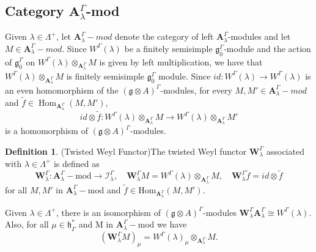 \documentclass[11pt]{amsart}
\theoremstyle{plain}
\theoremstyle{definition}
\newtheorem{defn}[thm]{Definition}
\newcommand{\g}{\mathfrak{g}}
\newcommand{\h}{\mathfrak{h}}
\newcommand{\A}{\mathbf{A}_{\lambda}^{\Gamma}}
\DeclareMathOperator{\Hom}{Hom}
\begin{document}
\subsection{Category $\A$-mod}\label{sub:2}
Given $\lambda\in \Lambda^+$, let $\mathbf{A}_{\lambda}^{\Gamma}-mod$ denote the category of left $\mathbf{A}_{\lambda}^{\Gamma}$-modules and let $M\in\mathbf{A}_{\lambda}^{\Gamma}-mod$. Since $W^\Gamma(\lambda)$ be a finitely semisimple $\g_{\bar{0}}^{\Gamma}$-module and the action of $\g_{\bar{0}}^{\Gamma}$ on $W^\Gamma(\lambda)\otimes_{\mathbf{A}_{\lambda}^{\Gamma}} M$ is given by left multiplication, we have that $W^\Gamma(\lambda)\otimes_{\mathbf{A}_{\lambda}^{\Gamma}}M$ is finitely semisimple $\g_{\bar{0}}^{\Gamma}$ module. Since $id:W^\Gamma(\lambda)\rightarrow W^\Gamma(\lambda)$ is an even homomorphism of the $(\g\otimes A)^\Gamma$-modules, for every $M, M'\in \mathbf{A}_{\lambda}^{\Gamma}-mod$ and $\tilde f\in \Hom_{\mathbf{A}_{\lambda}^{\Gamma}}(M,M')$,
\begin{equation*}
    id\otimes \tilde f:W^\Gamma(\lambda)\otimes_{\mathbf{A}_{\lambda}^{\Gamma}} M\rightarrow W^\Gamma(\lambda)\otimes_{\mathbf{A}_{\lambda}^{\Gamma}} M'
\end{equation*}
is a homomorphism of $(\g\otimes A)^\Gamma$-modules.
\begin{defn}(Twisted Weyl Functor)\label{def:5}
  The twisted Weyl functor $\mathbf{W}_\lambda^{\Gamma}$  associated with $\lambda\in \Lambda^+$ is defined as 
\begin{equation*}
\mathbf{W}_\lambda^{\Gamma}:\mathbf{A}_{\lambda}^{\Gamma}-\mathrm{mod}\rightarrow\mathcal{I}_{\lambda}^{\Gamma}, \quad \mathbf{W}_\lambda^{\Gamma}M=W^\Gamma(\lambda)\otimes_{\mathbf{A}_{\lambda}^{\Gamma}} M, \quad \mathbf{W}_\lambda^{\Gamma} \tilde f=id\otimes \tilde f
\end{equation*}  
for all $M, M'$ in $\mathbf{A}_{\lambda}^{\Gamma}-\mathrm{mod}$ and $\tilde f\in \mathrm{Hom}_{\mathbf{A}_{\lambda}^{\Gamma}}(M,M')$.
\end{defn}
Given $\lambda\in \Lambda^+$, there is an isomorphism of $(\g\otimes A)^\Gamma$-modules $\mathbf{W}_\lambda^{\Gamma}\mathbf{A}_{\lambda}^{\Gamma}\cong W^\Gamma(\lambda)$. Also, for all $\mu\in\h^{*}_{\Gamma}$ and M in $\mathbf{A}_{\lambda}^{\Gamma}-\mathrm{mod}$ we have
\begin{equation}
(\mathbf{W}_{\lambda}^{\Gamma}M)_\mu=W^\Gamma(\lambda)_\mu\otimes_{\mathbf{A}_{\lambda}^{\Gamma}} M.
\end{equation}
\end{document}
